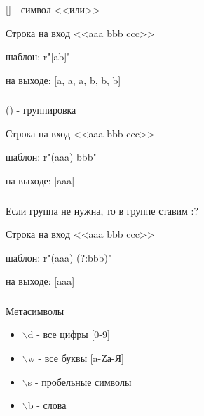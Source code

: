 \documentclass[t, 11pt]{beamer}
\begin{document}
	\begin{frame}
	\frametitle{\insertsection}
	\frametitle{\insertsubsection}  
	[] - символ <<или>>
	
	\vspace{0.5cm}
	
	Строка на вход  <<aaa bbb ccc>>
	
	\vspace{0.5cm}
	
	шаблон: r"[ab]"
	
	\vspace{0.5cm}
	
	на выходе: [a, a, a, b, b, b]
	
\end{frame}


	\begin{frame}
	\frametitle{\insertsection}
	\frametitle{\insertsubsection}  
	() - группировка 
	
	\vspace{0.5cm}
	
	Строка на вход  <<aaa bbb ccc>>
	
	\vspace{0.5cm}
	
	шаблон: r"(aaa) bbb"
	
	\vspace{0.5cm}
	
	на выходе: [aaa]
	
\end{frame}

	\begin{frame}
	\frametitle{\insertsection}
	\frametitle{\insertsubsection}  
	Если группа не нужна, то в группе ставим :?
	
	\vspace{0.5cm}
	
	Строка на вход  <<aaa bbb ccc>>
	
	\vspace{0.5cm}
	
	шаблон: r"(aaa) (?:bbb)"
	
	\vspace{0.5cm}
	
	на выходе: [aaa]
	
\end{frame}

	\begin{frame}
	\frametitle{\insertsection}
	\frametitle{\insertsubsection}  
	Метасимволы
	\begin{itemize}
		\item $\backslash$d - все цифры [0-9]
		\item $\backslash$w - все буквы [a-Zа-Я]
		\item $\backslash$s - пробельные символы 
		\item  $\backslash$b - слова
	\end{itemize}
\end{frame}
\end{document}
